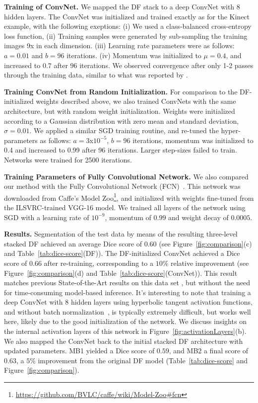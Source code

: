\documentclass[twocolumn]{svjour3}
\begin{document}
\textbf{Training of ConvNet. }
%
We mapped the DF stack to a deep ConvNet with 8 hidden layers.
The ConvNet was initialized and trained exactly as for the Kinect example, with the following exeptions:
(i) We used a class-balanced cross-entropy loss function,
(ii) Training samples were generated by sub-sampling the training images 9x in each dimension.
(iii) Learning rate parameters were as follows: $a = 0.01$ and $b = 96$ iterations.
(iv) Momentum was initialized to $\mu = 0.4$, and increased to $0.7$ after $96$ iterations.
We observed convergence after only 1-2 passes through the training data, similar to what was reported by \cite{GirshickDDM14}.

\textbf{Training ConvNet from Random Initialization. }
%
For comparison to the DF-initialized weights described above, we also trained ConvNets with the same architecture, but with random weight initialization.
Weights were initialized according to a Gaussian distribution with zero mean and standard deviation, $\sigma = 0.01$.
We applied a similar SGD training routine, and re-tuned the hyper-parameters as follows: $a = 3$x$10^{-5}$, $b=96$ iterations, momentum was initialized to 0.4 and increased to 0.99 after 96 iterations.
Larger step-sizes failed to train.
Networks were trained for 2500 iterations.

\textbf{Training Parameters of Fully Convolutional Network. }
%
We also compared our method with the Fully Convolutional Network (FCN)~\cite{long_shelhamer_fcn_2015}.
This network was downloaded from Caffe's Model Zoo\footnote{\url{https://github.com/BVLC/caffe/wiki/Model-Zoo\#fcn}}, and initialized with weights fine-tuned from the ILSVRC-trained VGG-16 model.
We trained all layers of the network using SGD with a learning rate of $10^{-9}$, momentum of $0.99$ and weight decay of $0.0005$.

%
\textbf{Results. }
%
Segmentation of the test data by means of the resulting three-level stacked DF achieved an average Dice score of 0.60
(see Figure~\ref{fig:comparison}(c)
and Table~\ref{tab:dice-score}(DF)).
The DF-initialized ConvNet achieved a Dice score of 0.66 after re-training, corresponding to a $10\%$ relative improvement
(see Figure~\ref{fig:comparison}(d)
and Table~\ref{tab:dice-score}(ConvNet)).
This result matches previous State-of-the-Art results on this data set \cite{richmueller}, but without the need for time-consuming model-based inference.
It's interesting to note that training a deep ConvNet with 8 hidden layers using hyperbolic tangent activation functions, and without batch normalization~\cite{batchnorm}, is typically extremely difficult, but works well here, likely due to the good initialization of the network.
We discuss insights on the internal activation layers of this network in Figure~\ref{fig:activationLayers}(b).
We also mapped the ConvNet back to the initial stacked DF architecture with updated parameters.
MB1 yielded a Dice score of $0.59$, and MB2 a final score of $0.63$, a $5\%$ improvement from the original DF model (Table~\ref{tab:dice-score} and Figure~\ref{fig:comparison}).
\end{document}
